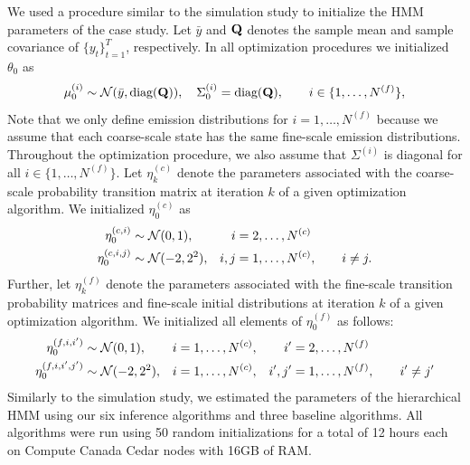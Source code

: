 We used a procedure similar to the simulation study to initialize the HMM parameters of the case study. Let $\bar y$ and $\mathbf{Q}$ denotes the sample mean and sample covariance of $\{y_t\}_{t=1}^T$, respectively. In all optimization procedures we initialized $\theta_0$ as
%
\begin{equation}
    \mu^{(i)}_0 \sim \mathcal{N}(\bar y, \text{diag}(\mathbf{Q})), \quad \Sigma^{(i)}_0 = \text{diag}(\mathbf{Q}), \qquad i \in \{1,\ldots,N^{(f)}\},
\end{equation}
%
Note that we only define emission distributions for $i = 1,\ldots,N^{(f)}$ because we assume that each coarse-scale state has the same fine-scale emission distributions.
Throughout the optimization procedure, we also assume that $\Sigma^{(i)}$ is diagonal for all $i \in \{1,\ldots,N^{(f)}\}$.
%
Let $\eta_k^{(c)}$ denote the parameters associated with the coarse-scale probability transition matrix at iteration $k$ of a given optimization algorithm. We initialized $\eta_0^{(c)}$ as
%
\begin{align}
    \eta^{(c,i)}_{0} &\sim \mathcal{N}(0,1), & i & = 2,\ldots,N^{(c)} \\
    \eta^{(c,i,j)}_{0} &\sim \mathcal{N}(-2,2^2), & i,j & = 1,\ldots,N^{(c)}, \qquad i \neq j.
\end{align}
%
Further, let $\eta_k^{(f)}$ denote the parameters associated with the fine-scale transition probability matrices and fine-scale initial distributions at iteration $k$ of a given optimization algorithm. We initialized all elements of $\eta^{(f)}_{0}$ 
as follows:
%
\begin{align}
    \eta^{(f,i,i')}_{0} &\sim \mathcal{N}(0,1), & i & = 1,\ldots,N^{(c)}, & i' & = 2,\ldots,N^{(f)} \\
    \eta^{(f,i,i',j')}_{0} &\sim \mathcal{N}(-2,2^2), & i & = 1,\ldots,N^{(c)}, & i',j' & = 1,\ldots,N^{(f)}, \qquad i' \neq j'
\end{align}
%
%
Similarly to the simulation study, we estimated the parameters of the hierarchical HMM using our six inference algorithms and three baseline algorithms.
%
All algorithms were run using 50 random initializations for a total of 12 hours each on Compute Canada Cedar nodes with 16GB of RAM.

